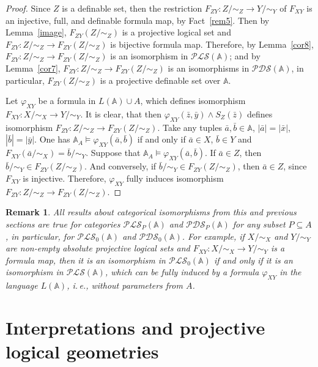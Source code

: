 \documentclass[12pt]{article}
\newtheorem{remark}{Remark}
\theoremstyle{definition}
\def\MA{{\mathbb{A}}}
\def\PLS{{\mathcal{PLS}}}
\def\PDS{{\mathcal{PDS}}}
\begin{document}
\begin{proof}
Since $Z$ is a definable set, then the restriction $F_{ZY}\colon Z/{\sim_Z}\to Y/{\sim_Y}$ of $F_{XY}$ is an injective, full, and definable formula map, by Fact~\ref{rem5}. Then by Lemma~\ref{image}, $F_{ZY}(Z/{\sim_Z})$ is a projective logical set and $F_{ZY}\colon Z/{\sim_Z}\to F_{ZY}(Z/{\sim_Z})$ is bijective formula map. Therefore, by Lemma~\ref{cor8}, $F_{ZY}\colon Z/{\sim_Z}\to F_{ZY}(Z/{\sim_Z})$ is an isomorphism in $\PLS(\MA)$; and by Lemma~\ref{cor7}, $F_{ZY}\colon Z/{\sim_Z}\to F_{ZY}(Z/{\sim_Z})$ is an isomorphisms in $\PDS(\MA)$, in particular, $F_{ZY}(Z/{\sim_Z})$ is a projective definable set over $\MA$.

Let $\varphi_{XY}$ be a formula in  $L(\MA)\cup A$, which defines isomorphism $F_{XY}\colon X/{\sim_X}\to Y/{\sim_Y}$. It is clear, that then $\varphi_{XY}(\bar z,\bar y)\wedge S_Z(\bar z)$ defines  isomorphism $F_{ZY}\colon Z/{\sim_Z}\to F_{ZY}(Z/{\sim_Z})$. Take any tuples $\bar a,\bar b\in \MA$, $|\bar a|=|\bar x|$, $|\bar b|=|\bar y|$. One has $\MA_A\models\varphi_{XY}(\bar a,\bar b)$ if and only if $\bar a\in X$, $\bar b\in Y$ and $F_{XY}(\bar a/{\sim_X})=\bar b/{\sim_Y}$. Suppose that $\MA_A\models\varphi_{XY}(\bar a,\bar b)$. If $\bar a\in Z$, then $\bar b/{\sim_Y}\in F_{ZY}(Z/{\sim_Z})$. And conversely, if $\bar b/{\sim_Y}\in F_{ZY}(Z/{\sim_Z})$, then $\bar a\in Z$, since $F_{XY}$ is injective. Therefore, $\varphi_{XY}$ fully induces isomorphism $F_{ZY}\colon Z/{\sim_Z}\to F_{ZY}(Z/{\sim_Z})$. 
\end{proof}

\begin{remark}\label{remark:P}
  All results about categorical isomorphisms from this and previous sections are true for categories $\PLS_P(\MA)$ and $\PDS_P(\MA)$ for any subset $P\subseteq A$, in particular, for $\PLS_0(\MA)$ and $\PDS_0(\MA)$. For example, if $X/{\sim_X}$ and $Y/{\sim_Y}$ are non-empty absolute projective logical sets and $F_{XY}\colon X/{\sim_X}\to Y/{\sim_Y}$ is a formula map, then it is an isomorphism in $\PLS_0(\MA)$ if and only if it is an isomorphism in $\PLS(\MA)$, which can be fully induced by a formula $\varphi_{XY}$ in the language $L(\MA)$, i.\,e., without parameters from $A$.
\end{remark}

\section{Interpretations and projective logical geometries}\label{sec:int}
\end{document}
